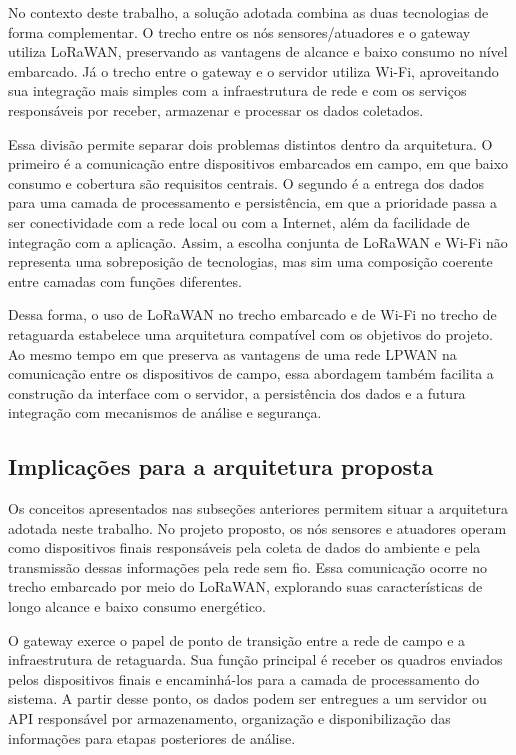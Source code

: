 No contexto deste trabalho, a solução adotada combina as duas tecnologias de forma complementar. O trecho entre os nós sensores/atuadores e o gateway utiliza LoRaWAN, preservando as vantagens de alcance e baixo consumo no nível embarcado. Já o trecho entre o gateway e o servidor utiliza Wi-Fi, aproveitando sua integração mais simples com a infraestrutura de rede e com os serviços responsáveis por receber, armazenar e processar os dados coletados.

Essa divisão permite separar dois problemas distintos dentro da arquitetura. O primeiro é a comunicação entre dispositivos embarcados em campo, em que baixo consumo e cobertura são requisitos centrais. O segundo é a entrega dos dados para uma camada de processamento e persistência, em que a prioridade passa a ser conectividade com a rede local ou com a Internet, além da facilidade de integração com a aplicação. Assim, a escolha conjunta de LoRaWAN e Wi-Fi não representa uma sobreposição de tecnologias, mas sim uma composição coerente entre camadas com funções diferentes.

Dessa forma, o uso de LoRaWAN no trecho embarcado e de Wi-Fi no trecho de retaguarda estabelece uma arquitetura compatível com os objetivos do projeto. Ao mesmo tempo em que preserva as vantagens de uma rede LPWAN na comunicação entre os dispositivos de campo, essa abordagem também facilita a construção da interface com o servidor, a persistência dos dados e a futura integração com mecanismos de análise e segurança.


\subsection{Implicações para a arquitetura proposta}

Os conceitos apresentados nas subseções anteriores permitem situar a arquitetura adotada neste trabalho. No projeto proposto, os nós sensores e atuadores operam como dispositivos finais responsáveis pela coleta de dados do ambiente e pela transmissão dessas informações pela rede sem fio. Essa comunicação ocorre no trecho embarcado por meio do LoRaWAN, explorando suas características de longo alcance e baixo consumo energético.

O gateway exerce o papel de ponto de transição entre a rede de campo e a infraestrutura de retaguarda. Sua função principal é receber os quadros enviados pelos dispositivos finais e encaminhá-los para a camada de processamento do sistema. A partir desse ponto, os dados podem ser entregues a um servidor ou API responsável por armazenamento, organização e disponibilização das informações para etapas posteriores de análise.

